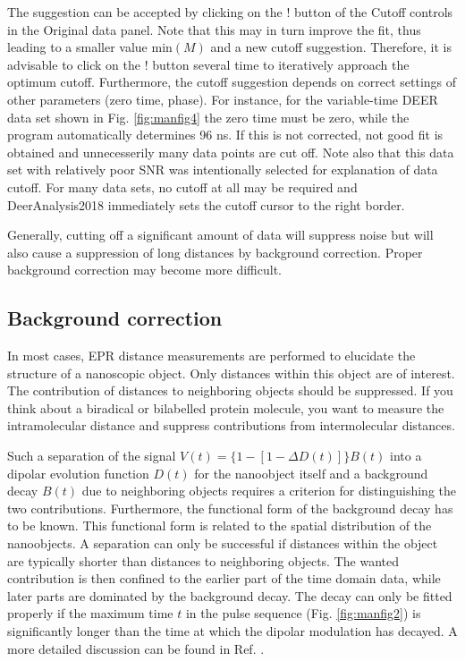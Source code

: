 \documentclass{article}
\begin{document}
The suggestion can be accepted by clicking on the {\ttfamily !} button of the {\ttfamily Cutoff} controls in the {\ttfamily Original data} panel. Note that this may in turn improve the fit, thus leading to a smaller value $\mathrm{min}(M)$ and a new cutoff suggestion. Therefore, it is advisable to click on the {\ttfamily !} button several time to iteratively approach the optimum cutoff. Furthermore, the cutoff suggestion depends on correct settings of other parameters (zero time, phase). For instance, for the variable-time DEER data set shown in Fig. \ref{fig:manfig4} the zero time must be zero, while the program automatically determines 96 ns. If this is not corrected, not good fit is obtained and unnecesserily many data points are cut off. Note also that this data set with relatively poor SNR was intentionally selected for explanation of data cutoff. For many data sets, no cutoff at all may be required and DeerAnalysis2018 immediately sets the cutoff cursor to the right border.

Generally, cutting off a significant amount of data will suppress noise but will also cause a suppression of long distances by background correction. Proper background correction may
become more difficult. 
 
\subsection{Background correction}
In most cases, EPR distance measurements are performed to elucidate the structure
of a nanoscopic object. Only distances within this object are of interest.
The contribution of distances to neighboring objects should be suppressed. If
you think about a biradical or bilabelled protein molecule, you want to measure
the intramolecular distance and suppress contributions from intermolecular
distances.

Such a separation of the signal $V(t)= \{ 1 - [1 - \Delta D(t)] \} B(t)$ into a dipolar evolution function $D(t)$ for the
nanoobject itself and a background decay $B(t)$ due to neighboring objects requires a
criterion for distinguishing the two contributions. Furthermore, the functional
form of the background decay has to be known. This functional form is related to
the spatial distribution of the nanoobjects. A separation can only be successful
if distances within the object are typically shorter than distances to neighboring
objects. The wanted contribution is then confined to the earlier part of the time domain
data, while later parts are dominated by the background decay. The
decay can only be fitted properly if the maximum time $t$ in the pulse sequence
(Fig. \ref{fig:manfig2}) is significantly longer than the time at which the dipolar modulation
has decayed. A more detailed discussion can be found in Ref. \cite{jeschke2004a}.
\end{document}
